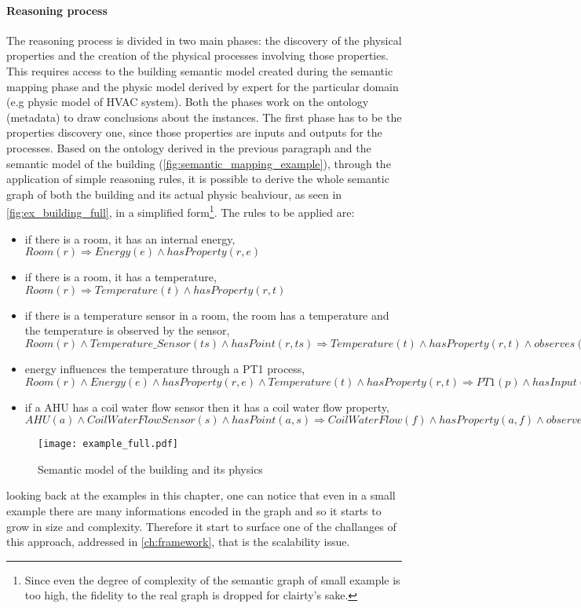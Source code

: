 \paragraph{Reasoning process}
The reasoning process is divided in two main phases: the discovery of the physical properties and the creation of the physical processes involving those properties. This requires access to the building semantic model created during the semantic mapping phase and the physic model derived by expert for the particular domain (e.g physic model of HVAC system). Both the phases work on the ontology (metadata) to draw conclusions about the instances. The first phase has to be the properties discovery one, since those properties are inputs and outputs for the processes. Based on the ontology derived in the previous paragraph and the semantic model of the building (\autoref{fig:semantic_mapping_example}), through the application of simple reasoning rules, it is possible to derive the whole semantic graph of both the building and its actual physic beahviour, as seen in \autoref{fig:ex_building_full}, in a simplified form\footnote{Since even the degree of complexity of the semantic graph of small example is too high, the fidelity to the real graph is dropped for clairty's sake.}.
The rules to be applied are:
\begin{itemize}
  \item if there is a room, it has an internal energy, $Room(r)\Rightarrow Energy(e)\wedge hasProperty(r,e)$
  \item if there is a room, it has a temperature, $Room(r)\Rightarrow Temperature(t)\wedge hasProperty(r,t)$
  \item if there is a temperature sensor in a room, the room has a temperature and the temperature is observed by the sensor, $Room(r)\wedge Temperature\_Sensor(ts)\wedge hasPoint(r,ts)\Rightarrow Temperature(t)\wedge hasProperty(r,t)\wedge observes(s,t)$
  \item energy influences the temperature through a PT1 process, $Room(r)\wedge Energy(e)\wedge hasProperty(r,e)\wedge Temperature(t)\wedge hasProperty(r,t)\Rightarrow PT1(p)\wedge hasInput(p,e)\wedge hasOutput(p,t)$
  \item if a AHU has a coil water flow sensor then it has a coil water flow property, $AHU(a)\wedge CoilWaterFlowSensor(s)\wedge hasPoint(a,s)\Rightarrow CoilWaterFlow(f)\wedge hasProperty(a,f)\wedge observes(s,f)$
\end{itemize}
\begin{figure}
  \centering
  \texttt{[image: example\_full.pdf]}
  \caption{Semantic model of the building and its physics}
  \label{fig:ex_building_full}
\end{figure}
looking back at the examples in this chapter, one can notice that even in a small example there are many informations encoded in the graph and so it starts to grow in size and complexity. Therefore it start to surface one of the challanges of this approach, addressed in \autoref{ch:framework}, that is the scalability issue.
